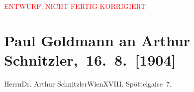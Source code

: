 
\begin{center}
            \textcolor{red}{ENTWURF, NICHT FERTIG KORRIGIERT}
                      \end{center}
            
         \renewcommand{\erwaehnteOrte}{Orte: Edmund-Weiß-Gasse, Mende, Wien}
         \renewcommand{\erwaehnteWerke}{}
               \section[ Paul Goldmann an Arthur Schnitzler, 16. 8. {[}1904{]}]{ Paul Goldmann an Arthur Schnitzler, 16. 8. {[}1904{]}}\nopagebreak{}\rehead{ }\begin{ledgroupsized}[t]{13cm}\normalsize\beginnumbering \toendnotes[C]{\smallbreak\pagebreak[2]} 
\pstart{}{\pb}Herrn\pend{}\pstart{}Dr. Arthur Schnitzler\pend{}\pstart{}Wien\pend{}\pstart{}XVIII. Spöttelgaſse 7.\pend{}{\bigskip}\pstart
           \noindent{}\pend
           
         
         \endnumbering{}\end{ledgroupsized}\begin{anhang}\end{anhang}\newcommand{\dateiname}{L03451}\newcommand{\titel}{Paul Goldmann an Arthur Schnitzler, 16. 8. [1904]}\newcommand{\editorInnen}{Martin Anton Müller und Laura Untner}
      